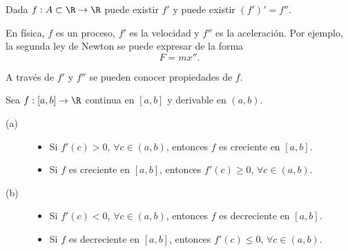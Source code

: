 Dada $\displaystyle f : A \subset \R \to \R $ puede existir $\displaystyle f' $ y puede existir $\displaystyle \left(f'\right)' = f'' $. 
\begin{observation}
\normalfont En física, $\displaystyle f $ es un proceso, $\displaystyle f' $ es la velocidad y $\displaystyle f'' $ es la aceleración. Por ejemplo, la segunda ley de Newton se puede expresar de la forma 
\[ F = m x'' .\]
\end{observation}
A través de $\displaystyle f' $ y $\displaystyle f'' $ se pueden conocer propiedades de $\displaystyle f $. 
\begin{ftheorem}[]
	\normalfont Sea $\displaystyle f : \left[a,b\right] \to \R $ continua en $\displaystyle [a,b] $ y derivable en $\displaystyle \left(a,b\right) $. 
\begin{description}
	\item[(a)] 
		\begin{itemize}
			\item Si $\displaystyle f'\left(c\right) > 0 $, $\displaystyle \forall c \in \left(a,b\right) $, entonces $\displaystyle f $ es creciente en $\displaystyle [a,b] $.
			\item Si $\displaystyle f $ es creciente en $\displaystyle [a,b] $, entonces $\displaystyle f'\left(c\right) \geq 0 $, $\displaystyle \forall c \in \left(a,b\right) $.
		\end{itemize}
		
	\item[(b)] 
		\begin{itemize}
			\item Si $\displaystyle f'\left(c\right) < 0 $, $\displaystyle \forall c \in \left(a,b\right) $, entonces $\displaystyle f $ es decreciente en $\displaystyle [a,b] $.
			\item Si $\displaystyle f $ es decreciente en $\displaystyle [a,b] $, entonces $\displaystyle f'\left(c\right) \leq 0 $, $\displaystyle \forall c \in \left(a,b\right) $.
		\end{itemize}
\end{description}
\end{ftheorem}
